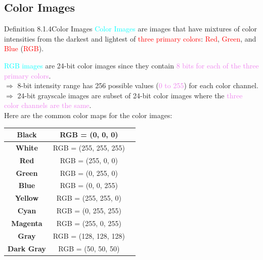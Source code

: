 \documentclass{book}
\begin{document}
\subsection{Color Images}
\begin{defBox}{Definition 8.1.4}{Color Images}
    \textcolor{cyan}{Color Images} are images that have mixtures of color intensities from the darkest and lightest of \textcolor{red}{three primary colors}: \textcolor{red}{Red}, \textcolor{red}{Green}, and \textcolor{red}{Blue} (\textcolor{red}{RGB}).
\end{defBox}
\textcolor{cyan}{RGB images} are 24-bit color images since they contain \textcolor{violet}{8 bits for each of the three primary colors}.\\
$\Rightarrow$ 8-bit intensity range has 256 possible values (\textcolor{violet}{0 to 255}) for each color channel.\\
$\Rightarrow$ 24-bit grayscale images are subset of 24-bit color images where the \textcolor{violet}{three color channels are the same}.\\
Here are the common color maps for the color images:
\begin{center}
    \begin{tabular}{|c|c|c|}
        \hline
        \textbf{Black} & RGB = (0, 0, 0) & \cellcolor{black} \\
        \hline
        \textbf{White} & RGB = (255, 255, 255) & \cellcolor{white} \\
        \hline
        \textbf{Red} & RGB = (255, 0, 0) & \cellcolor{red} \\
        \hline
        \textbf{Green} & RGB = (0, 255, 0) & \cellcolor{green} \\
        \hline
        \textbf{Blue} & RGB = (0, 0, 255) & \cellcolor{blue} \\
        \hline
        \textbf{Yellow} & RGB = (255, 255, 0) & \cellcolor{yellow} \\
        \hline
        \textbf{Cyan} & RGB = (0, 255, 255) & \cellcolor{cyan} \\
        \hline
        \textbf{Magenta} & RGB = (255, 0, 255) & \cellcolor{magenta} \\
        \hline
        \textbf{Gray} & RGB = (128, 128, 128) & \cellcolor{gray} \\
        \hline
        \textbf{Dark Gray} & RGB = (50, 50, 50) & \cellcolor{darkgray} \\
        \hline
    \end{tabular}
\end{center}
\end{document}

